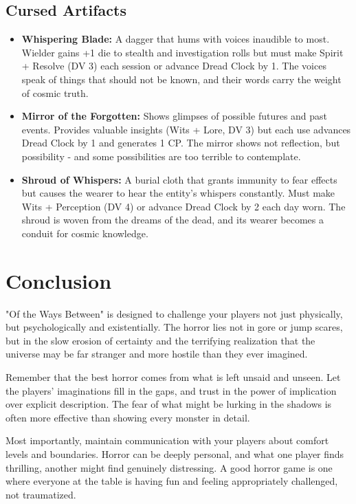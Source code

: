 \documentclass[11pt]{article}
\begin{document}
\subsection{Cursed Artifacts}

\begin{itemize}
\item \textbf{Whispering Blade:} A dagger that hums with voices inaudible to most. Wielder gains +1 die to stealth and investigation rolls but must make Spirit + Resolve (DV 3) each session or advance Dread Clock by 1. The voices speak of things that should not be known, and their words carry the weight of cosmic truth.
\item \textbf{Mirror of the Forgotten:} Shows glimpses of possible futures and past events. Provides valuable insights (Wits + Lore, DV 3) but each use advances Dread Clock by 1 and generates 1 CP. The mirror shows not reflection, but possibility - and some possibilities are too terrible to contemplate.
\item \textbf{Shroud of Whispers:} A burial cloth that grants immunity to fear effects but causes the wearer to hear the entity's whispers constantly. Must make Wits + Perception (DV 4) or advance Dread Clock by 2 each day worn. The shroud is woven from the dreams of the dead, and its wearer becomes a conduit for cosmic knowledge.
\end{itemize}

\section{Conclusion}

"Of the Ways Between" is designed to challenge your players not just physically, but psychologically and existentially. The horror lies not in gore or jump scares, but in the slow erosion of certainty and the terrifying realization that the universe may be far stranger and more hostile than they ever imagined.

Remember that the best horror comes from what is left unsaid and unseen. Let the players' imaginations fill in the gaps, and trust in the power of implication over explicit description. The fear of what might be lurking in the shadows is often more effective than showing every monster in detail.

Most importantly, maintain communication with your players about comfort levels and boundaries. Horror can be deeply personal, and what one player finds thrilling, another might find genuinely distressing. A good horror game is one where everyone at the table is having fun and feeling appropriately challenged, not traumatized.
\end{document}
